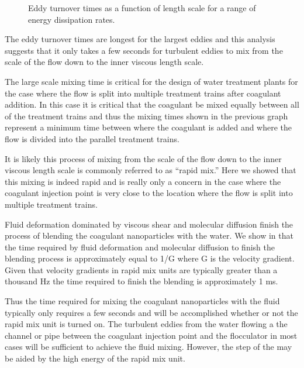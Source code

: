 \documentclass[letterpaper,10pt,english]{sphinxmanual}
\let\sphinxpxdimen\pdfpxdimen\else\newdimen\sphinxpxdimen
\begin{document}
\begin{figure}[htbp]
\centering
\capstart

\noindent\sphinxincludegraphics[width=400\sphinxpxdimen]{{Eddy_turnover_time}.png}
\caption{Eddy turnover times as a function of length scale for a range of energy dissipation rates.}\label{\detokenize{Rapid_Mix/RM_Intro:id11}}\label{\detokenize{Rapid_Mix/RM_Intro:figure-eddy-turnover-times}}\end{figure}

The eddy turnover times are longest for the largest eddies and this analysis suggests that it only takes a few seconds for turbulent eddies to mix from the scale of the flow down to the inner viscous length scale.

The large scale mixing time is critical for the design of water treatment plants for the case where the flow is split into multiple treatment trains after coagulant addition. In this case it is critical that the coagulant be mixed equally between all of the treatment trains and thus the mixing times shown in the previous graph represent a minimum time between where the coagulant is added and where the flow is divided into the parallel treatment trains.

It is likely this process of mixing from the scale of the flow down to the inner viscous length scale is commonly referred to as “rapid mix.” Here we showed that this mixing is indeed rapid and is really only a concern in the case where the coagulant injection point is very close to the location where the flow is split into multiple treatment trains.

Fluid deformation dominated by viscous shear and molecular diffusion finish the process of blending the coagulant nanoparticles with the water. We show in  that the time required by fluid deformation and molecular diffusion to finish the blending process is approximately equal to 1/G where G is the velocity gradient. Given that velocity gradients in rapid mix units are typically greater than a thousand Hz the time required to finish the blending is approximately 1 ms.

Thus the time required for mixing the coagulant nanoparticles with the fluid typically only requires a few seconds and will be accomplished whether or not the rapid mix unit is turned on. The turbulent eddies from the water flowing a the channel or pipe between the coagulant injection point and the flocculator in most cases will be sufficient to achieve the fluid mixing. However, the step of the {\hyperref[\detokenize{Rapid_Mix/RM_Theory_and_Future_Work:heading-diffusion-and-shear-transport-coagulant-nanoparticles-to-clay}]{}} may be aided by the high energy of the rapid mix unit.
\end{document}
